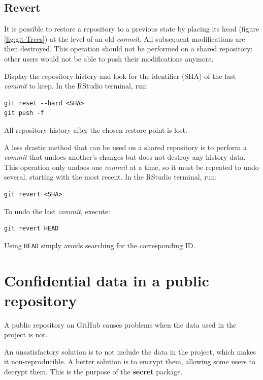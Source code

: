 \documentclass[
  12pt,
  american,
  a4paper,
  extrafontsizes,onecolumn,openright
  ]{memoir}
\newlength{\rf}
\begin{document}
\hypertarget{revert-1}{%
\subsection{Revert}\label{revert-1}}

It is possible to restore a repository to a previous state by placing its head (figure \ref{fig:git-Trees}) at the level of an old \emph{commit}.
All subsequent modifications are then destroyed.
This operation should not be performed on a shared repository: other users would not be able to push their modifications anymore.

Display the repository history and look for the identifier (SHA) of the last \emph{commit} to keep.
In the RStudio terminal, run:

\begin{verbatim}
git reset --hard <SHA>
git push -f
\end{verbatim}

All repository history after the chosen restore point is lost.

A less drastic method that can be used on a shared repository is to perform a \emph{commit} that undoes another's changes but does not destroy any history data.
This operation only undoes one \emph{commit} at a time, so it must be repeated to undo several, starting with the most recent.
In the RStudio terminal, run:

\begin{verbatim}
git revert <SHA>
\end{verbatim}

To undo the last \emph{commit}, execute:

\begin{verbatim}
git revert HEAD
\end{verbatim}

Using \texttt{HEAD} simply avoids searching for the corresponding ID.

\hypertarget{sec:confidential}{%
\section{Confidential data in a public repository}\label{sec:confidential}}

A public repository on GitHub causes problems when the data used in the project is not.

An unsatisfactory solution is to not include the data in the project, which makes it non-reproducible.
A better solution is to encrypt them, allowing some users to decrypt them.
This is the purpose of the \textbf{secret} package.
\end{document}
